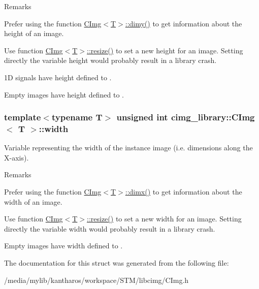 \begin{DoxyRemark}{Remarks}

\begin{DoxyItemize}
\item Prefer using the function \hyperlink{structcimg__library_1_1_c_img_aa1e128f9d950b39ed312eb368741970c}{CImg$<$T$>$::dimy()} to get information about the height of an image.
\item Use function \hyperlink{structcimg__library_1_1_c_img_a84970d569f01fc5f9370d9cc84428903}{CImg$<$T$>$::resize()} to set a new height for an image. Setting directly the variable {\ttfamily height} would probably result in a library crash.
\item 1D signals have {\ttfamily height} defined to {}.
\item Empty images have {\ttfamily height} defined to {}. 
\end{DoxyItemize}
\end{DoxyRemark}
\hypertarget{structcimg__library_1_1_c_img_a5fb74a7776210bb99fd6755319ade13f}{
\subsubsection[{width}]{\setlength{\rightskip}{0pt plus 5cm}template$<$typename T$>$ unsigned int {\bf cimg\_\-library::CImg}$<$ T $>$::{\bf width}}}
\label{structcimg__library_1_1_c_img_a5fb74a7776210bb99fd6755319ade13f}


Variable representing the width of the instance image (i.e. dimensions along the X-\/axis). 

\begin{DoxyRemark}{Remarks}

\begin{DoxyItemize}
\item Prefer using the function \hyperlink{structcimg__library_1_1_c_img_abf1a3c383880a20428b2ea9d22f3c06e}{CImg$<$T$>$::dimx()} to get information about the width of an image.
\item Use function \hyperlink{structcimg__library_1_1_c_img_a84970d569f01fc5f9370d9cc84428903}{CImg$<$T$>$::resize()} to set a new width for an image. Setting directly the variable {\ttfamily width} would probably result in a library crash.
\item Empty images have {\ttfamily width} defined to {}. 
\end{DoxyItemize}
\end{DoxyRemark}


The documentation for this struct was generated from the following file:\begin{DoxyCompactItemize}
\item 
/media/mylib/kantharos/workspace/STM/libcimg/CImg.h\end{DoxyCompactItemize}
